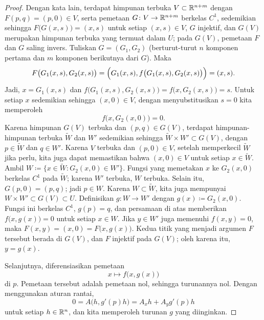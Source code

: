 \begin{proof}
Dengan kata lain, terdapat himpunan terbuka $V \subset {\mathbb{R}}^{n+m}$ dengan
$F(p,q) = (p,0) \in V$,
serta pemetaan
$G \colon V \to {\mathbb{R}}^{n+m}$ berkelas $C^1$, sedemikian sehingga $F\bigl(G(x,s)\bigr) = (x,s)$ untuk
setiap $(x,s) \in V$, $G$ injektif, dan $G(V)$ merupakan himpunan terbuka yang termuat dalam $U$; pada
$G(V)$, pemetaan $F$ dan $G$ saling invers. %
Tuliskan $G = (G_1,G_2)$ (berturut-turut $n$ komponen pertama dan $m$ komponen berikutnya dari $G$).
Maka
\begin{equation*}
F\bigl(G_1(x,s),G_2(x,s)\bigr) = \Bigl(G_1(x,s),f\bigl(G_1(x,s),G_2(x,s) \bigr)\Bigr)
= (x,s) .
\end{equation*}
Jadi, $x = G_1(x,s)$ dan $f\bigl(G_1(x,s),G_2(x,s)\bigr) = f\bigl(x,G_2(x,s)\bigr) = s$.
Untuk setiap $x$ sedemikian sehingga $(x,0) \in V$, dengan menyubstitusikan $s=0$ kita memperoleh
\begin{equation*}
f\bigl(x,G_2(x,0)\bigr) = 0 .
\end{equation*}
Karena himpunan $G(V)$ terbuka dan $(p,q) \in G(V)$,
terdapat himpunan-himpunan terbuka
$\widetilde{W}$ dan $W'$ sedemikian sehingga $\widetilde{W} \times W' \subset G(V)$, dengan $p
\in \widetilde{W}$ dan
$q \in W'$.  Karena $V$ terbuka dan $(p,0) \in V$, setelah memperkecil
$\widetilde{W}$ jika perlu, kita juga dapat memastikan bahwa $(x,0) \in V$ untuk setiap
$x \in \widetilde{W}$.
Ambil $W \coloneqq \bigl\{ x \in \widetilde{W} : G_2(x,0) \in W' \bigr\}$.
Fungsi yang memetakan $x$ ke $G_2(x,0)$ berkelas $C^1$ pada $\widetilde{W}$; karena
$W'$ terbuka, $W$ terbuka.  Selain itu, $G(p,0)=(p,q)$; jadi $p \in W$.
Karena $W \subset \widetilde{W}$, kita juga mempunyai $W \times W' \subset G(V) \subset U$.
Definisikan
$g \colon W \to W'$ dengan $g(x) \coloneqq G_2(x,0)$.  Fungsi ini berkelas $C^1$,
$g(p)=q$, dan persamaan di atas memberikan $f\bigl(x,g(x)\bigr)=0$ untuk setiap $x \in W$.
Jika $y \in W'$ juga memenuhi $f(x,y)=0$, maka
$F(x,y)=(x,0)=F\bigl(x,g(x)\bigr)$.  Kedua titik yang menjadi argumen $F$ tersebut berada di $G(V)$,
dan $F$ injektif pada $G(V)$; oleh karena itu, $y=g(x)$.

Selanjutnya, diferensiasikan pemetaan
\begin{equation*}
x\mapsto f\bigl(x,g(x)\bigr)
\end{equation*}
di $p$.
Pemetaan tersebut adalah pemetaan nol, sehingga turunannya nol.
Dengan menggunakan aturan rantai,
\begin{equation*}
0 = A\bigl(h,g'(p)h\bigr) = A_xh + A_yg'(p)h
\end{equation*}
untuk setiap $h \in {\mathbb{R}}^{n}$,
dan kita memperoleh turunan $g$ yang diinginkan.
\end{proof}

